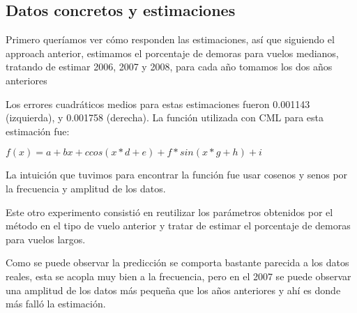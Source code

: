 \subsection{Datos concretos y estimaciones}

Primero queríamos ver cómo responden las estimaciones, así que siguiendo el approach anterior, estimamos el porcentaje de demoras para vuelos medianos, tratando de estimar 2006, 2007 y 2008, para cada año tomamos los dos años anteriores


Los errores cuadráticos medios para estas estimaciones fueron 0.001143 (izquierda), y 0.001758 (derecha). La función utilizada con CML para esta estimación fue:

\bigskip

$f(x) = a + bx +c cos(x*d+e) + f * sin(x*g+h) + i$

La intuición que tuvimos para encontrar la función fue usar cosenos y senos por la frecuencia y amplitud de los datos.

Este otro experimento consistió en reutilizar los parámetros obtenidos por el método en el tipo de vuelo anterior y tratar de estimar el porcentaje de demoras para vuelos largos. 


Como se puede observar la predicción se comporta bastante parecida a los datos reales, esta se acopla muy bien a la frecuencia, pero en el 2007 se puede observar una amplitud de los datos más pequeña que los años anteriores y ahí es donde más falló la estimación.